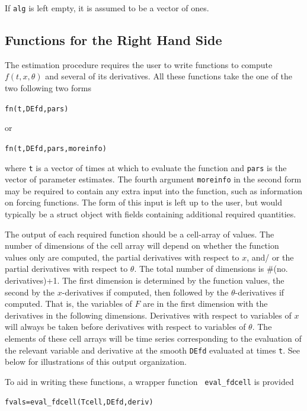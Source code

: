 \documentclass{article}
\newcommand{\nt}    {\noindent}
\begin{document}
If {\tt alg} is left empty, it is assumed to
be a vector of ones.

\subsection{Functions for the Right Hand Side}

The estimation procedure requires the user to write functions to compute $f(t,x,\theta)$ and
several of its derivatives. All these functions take the one of the two following two forms

\begin{alltt}
   fn(t,DEfd,pars)
\end{alltt}

or

\begin{alltt}
   fn(t,DEfd,pars,moreinfo)
\end{alltt}

\nt where {\tt t} is a vector of times at which to evaluate the function and {\tt pars} is the
vector of parameter estimates. The fourth argument {\tt moreinfo} in the second form may be
required to contain any extra input into the function, such as information on forcing functions.
The form of this input is left up to the user, but would typically be a struct object with fields
containing additional required quantities.

The output of each required function should be a cell-array of values. The number of dimensions of
the cell array will depend on whether the function values only are computed, the partial
derivatives with respect to $x$, and/ or the partial derivatives with respect to $\theta$. The
total number of dimensions is  \#(no. derivatives)+1. The first dimension is determined by the
function values, the second by the $x$-derivatives if computed, then followed by the
$\theta$-derivatives if computed.  That is, the variables of $F$ are in the first dimension with
the derivatives in the following dimensions. Derivatives with respect to variables of $x$ will
always be taken before derivatives with respect to variables of $\theta$. The elements of these
cell arrays will be time series corresponding to the evaluation of the relevant variable and
derivative at the smooth {\tt DEfd} evaluated at times {\tt t}.  See below for illustrations of
this output organization.

To aid in writing these functions, a wrapper function {\tt
  eval\_fdcell} is provided

\begin{alltt}
   fvals = eval_fdcell(Tcell,DEfd,deriv)
\end{alltt}
\end{document}
